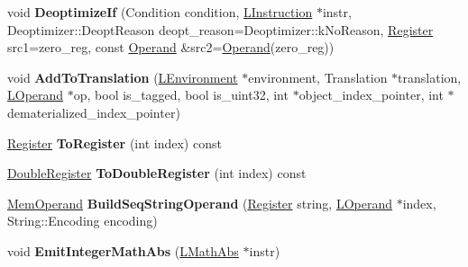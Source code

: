 \begin{DoxyCompactItemize}
\item 
void {\bfseries Deoptimize\+If} (Condition condition, \hyperlink{classv8_1_1internal_1_1_l_instruction}{L\+Instruction} $\ast$instr, Deoptimizer\+::\+Deopt\+Reason deopt\+\_\+reason=Deoptimizer\+::k\+No\+Reason, \hyperlink{structv8_1_1internal_1_1_register}{Register} src1=zero\+\_\+reg, const \hyperlink{classv8_1_1internal_1_1_operand}{Operand} \&src2=\hyperlink{classv8_1_1internal_1_1_operand}{Operand}(zero\+\_\+reg))\hypertarget{classv8_1_1internal_1_1_l_code_gen_a5a7b7d53ff3fa6398730855c7c65bd6c}{}\label{classv8_1_1internal_1_1_l_code_gen_a5a7b7d53ff3fa6398730855c7c65bd6c}

\item 
void {\bfseries Add\+To\+Translation} (\hyperlink{classv8_1_1internal_1_1_l_environment}{L\+Environment} $\ast$environment, Translation $\ast$translation, \hyperlink{classv8_1_1internal_1_1_l_operand}{L\+Operand} $\ast$op, bool is\+\_\+tagged, bool is\+\_\+uint32, int $\ast$object\+\_\+index\+\_\+pointer, int $\ast$dematerialized\+\_\+index\+\_\+pointer)\hypertarget{classv8_1_1internal_1_1_l_code_gen_a418f466c19b6671a29663f4378a36d8c}{}\label{classv8_1_1internal_1_1_l_code_gen_a418f466c19b6671a29663f4378a36d8c}

\item 
\hyperlink{structv8_1_1internal_1_1_register}{Register} {\bfseries To\+Register} (int index) const \hypertarget{classv8_1_1internal_1_1_l_code_gen_ae4d98c4f4146a2d8ea844342a5bae0ea}{}\label{classv8_1_1internal_1_1_l_code_gen_ae4d98c4f4146a2d8ea844342a5bae0ea}

\item 
\hyperlink{structv8_1_1internal_1_1_double_register}{Double\+Register} {\bfseries To\+Double\+Register} (int index) const \hypertarget{classv8_1_1internal_1_1_l_code_gen_a371876b861c4031096e632a0af70b549}{}\label{classv8_1_1internal_1_1_l_code_gen_a371876b861c4031096e632a0af70b549}

\item 
\hyperlink{classv8_1_1internal_1_1_mem_operand}{Mem\+Operand} {\bfseries Build\+Seq\+String\+Operand} (\hyperlink{structv8_1_1internal_1_1_register}{Register} string, \hyperlink{classv8_1_1internal_1_1_l_operand}{L\+Operand} $\ast$index, String\+::\+Encoding encoding)\hypertarget{classv8_1_1internal_1_1_l_code_gen_a20aee7187252d655324a448e52b821d2}{}\label{classv8_1_1internal_1_1_l_code_gen_a20aee7187252d655324a448e52b821d2}

\item 
void {\bfseries Emit\+Integer\+Math\+Abs} (\hyperlink{classv8_1_1internal_1_1_l_math_abs}{L\+Math\+Abs} $\ast$instr)\hypertarget{classv8_1_1internal_1_1_l_code_gen_a47f49c0b36ce0adea0f302d6d3e44716}{}\label{classv8_1_1internal_1_1_l_code_gen_a47f49c0b36ce0adea0f302d6d3e44716}


\end{DoxyCompactItemize}

